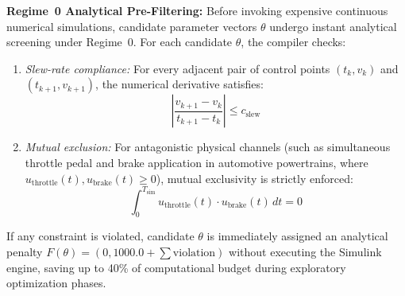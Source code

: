 \documentclass[journal]{IEEEtran}
\begin{document}
\noindent\textbf{Regime~0 Analytical Pre-Filtering:}
Before invoking expensive continuous numerical simulations, candidate parameter vectors $\theta$ undergo instant analytical screening under Regime~0. For each candidate $\theta$, the compiler checks:
\begin{enumerate}
    \item \textit{Slew-rate compliance:} For every adjacent pair of control points $(t_k, v_k)$ and $(t_{k+1}, v_{k+1})$, the numerical derivative satisfies:
    \begin{equation}
    \left| \frac{v_{k+1} - v_k}{t_{k+1} - t_k} \right| \le c_{\mathrm{slew}}
    \end{equation}
    \item \textit{Mutual exclusion:} For antagonistic physical channels (such as simultaneous throttle pedal and brake application in automotive powertrains, where $u_{\mathrm{throttle}}(t), u_{\mathrm{brake}}(t) \ge 0$), mutual exclusivity is strictly enforced:
    \begin{equation}
    \int_0^{T_{\mathrm{sim}}} u_{\mathrm{throttle}}(t) \cdot u_{\mathrm{brake}}(t) \, dt = 0
    \end{equation}
\end{enumerate}
If any constraint is violated, candidate $\theta$ is immediately assigned an analytical penalty $F(\theta) = (0, 1000.0 + \sum \text{violation})$ without executing the Simulink engine, saving up to 40\% of computational budget during exploratory optimization phases.
\end{document}
